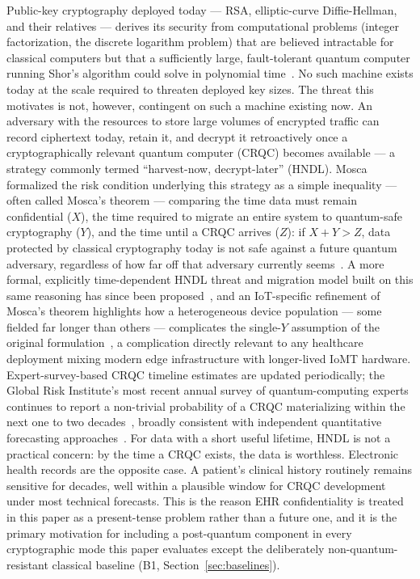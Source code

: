\documentclass[journal]{IEEEtran}
\begin{document}
Public-key cryptography deployed today --- RSA, elliptic-curve Diffie-Hellman, and their relatives --- derives its security from computational problems (integer factorization, the discrete logarithm problem) that are believed intractable for classical computers but that a sufficiently large, fault-tolerant quantum computer running Shor's algorithm could solve in polynomial time~\cite{shor1997factoring}. No such machine exists today at the scale required to threaten deployed key sizes. The threat this motivates is not, however, contingent on such a machine existing now. An adversary with the resources to store large volumes of encrypted traffic can record ciphertext today, retain it, and decrypt it retroactively once a cryptographically relevant quantum computer (CRQC) becomes available --- a strategy commonly termed ``harvest-now, decrypt-later'' (HNDL). Mosca formalized the risk condition underlying this strategy as a simple inequality --- often called Mosca's theorem --- comparing the time data must remain confidential ($X$), the time required to migrate an entire system to quantum-safe cryptography ($Y$), and the time until a CRQC arrives ($Z$): if $X + Y > Z$, data protected by classical cryptography today is not safe against a future quantum adversary, regardless of how far off that adversary currently seems~\cite{mosca2018cybersecurity}. A more formal, explicitly time-dependent HNDL threat and migration model built on this same reasoning has since been proposed~\cite{hndltimemodel2025}, and an IoT-specific refinement of Mosca's theorem highlights how a heterogeneous device population --- some fielded far longer than others --- complicates the single-$Y$ assumption of the original formulation~\cite{moscarefinediot2022}, a complication directly relevant to any healthcare deployment mixing modern edge infrastructure with longer-lived IoMT hardware. Expert-survey-based CRQC timeline estimates are updated periodically; the Global Risk Institute's most recent annual survey of quantum-computing experts continues to report a non-trivial probability of a CRQC materializing within the next one to two decades~\cite{gri2025timelinereport}, broadly consistent with independent quantitative forecasting approaches~\cite{forecastingqctimelines2020}. For data with a short useful lifetime, HNDL is not a practical concern: by the time a CRQC exists, the data is worthless. Electronic health records are the opposite case. A patient's clinical history routinely remains sensitive for decades, well within a plausible window for CRQC development under most technical forecasts. This is the reason EHR confidentiality is treated in this paper as a present-tense problem rather than a future one, and it is the primary motivation for including a post-quantum component in every cryptographic mode this paper evaluates except the deliberately non-quantum-resistant classical baseline (B1, Section~\ref{sec:baselines}).
\end{document}
